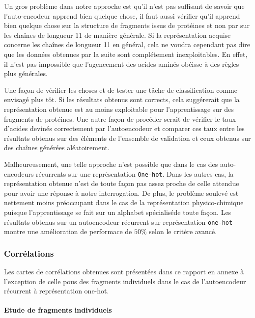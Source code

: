 \documentclass[a4paper, 11pt, onecolumn]{article}
\begin{document}
Un gros problème dans notre approche est qu'il n'est pas suffisant de savoir que
l'auto-encodeur apprend bien quelque chose, il faut aussi vérifier qu'il apprend
bien quelque chose sur la structure de fragments issus de protéines et non par
sur les chaînes de longueur 11 de manière générale. Si la représentation acquise
concerne les chaînes de longueur 11 en général, cela ne voudra cependant pas dire que les
données obtenues par la suite sont complétement inexploitables. En effet, il
n'est pas impossible que l'agencement des acides aminés obéisse à des règles
plus générales.

Une façon de vérifier les
choses et de tester une tâche de classification comme envisagé plus tôt. Si
les résultats obtenus sont corrects, cela suggérerait que la représentation
obtenue est au moins exploitable pour l'apprentissage sur des fragments de
protéines. Une autre façon de procéder serait de vérifier le taux d'acides
devinés correctement par l'autoencodeur et comparer ces taux entre les résultats
obtenus sur des éléments de l'ensemble de validation et ceux obtenus sur des
chaînes générées aléatoirement.

Malheureusement, une telle approche n'est possible que dans le cas des
auto-encodeurs récurrents sur une représentation \texttt{One-hot}. Dans les
autres cas, la représentation obtenue n'est de toute façon pas assez proche de
celle attendue pour avoir une réponse à notre interrogation. De plus, le
problème soulevé est nettement moins préoccupant dans le cas de la
représentation physico-chimique puisque l'apprentissage se fait sur un alphabet
\og spécialisé\fg de toute façon. Les résultats obtenus sur un autoencodeur
récurrent sur représentation \texttt{one-hot} montre une amélioration de
performace de $50\%$ selon le critére avancé.

\subsubsection{Corrélations}

Les cartes de corrélations obtenues sont présentées dans ce rapport en annexe à
l'exception de celle pous des fragments individuels dans le cas de
l'autoencodeur récurrent à représentation one-hot.

\paragraph{Etude de fragments individuels}
\end{document}
